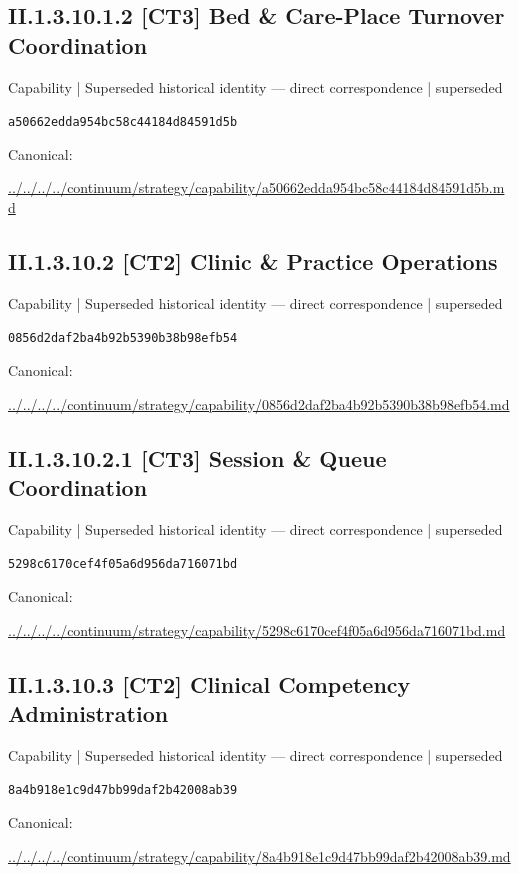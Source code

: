 \documentclass[10pt,a4paper]{article}
\begin{document}
\subsection*{II.1.3.10.1.2 [CT3] Bed \& Care-Place Turnover Coordination}
{\small Capability | Superseded historical identity — direct correspondence | superseded}\par
\texttt{a50662edda954bc58c44184d84591d5b}\par
Canonical: \par
{\footnotesize\url{../../../../continuum/strategy/capability/a50662edda954bc58c44184d84591d5b.md}}\par
\subsection*{II.1.3.10.2 [CT2] Clinic \& Practice Operations}
{\small Capability | Superseded historical identity — direct correspondence | superseded}\par
\texttt{0856d2daf2ba4b92b5390b38b98efb54}\par
Canonical: \par
{\footnotesize\url{../../../../continuum/strategy/capability/0856d2daf2ba4b92b5390b38b98efb54.md}}\par
\subsection*{II.1.3.10.2.1 [CT3] Session \& Queue Coordination}
{\small Capability | Superseded historical identity — direct correspondence | superseded}\par
\texttt{5298c6170cef4f05a6d956da716071bd}\par
Canonical: \par
{\footnotesize\url{../../../../continuum/strategy/capability/5298c6170cef4f05a6d956da716071bd.md}}\par
\subsection*{II.1.3.10.3 [CT2] Clinical Competency Administration}
{\small Capability | Superseded historical identity — direct correspondence | superseded}\par
\texttt{8a4b918e1c9d47bb99daf2b42008ab39}\par
Canonical: \par
{\footnotesize\url{../../../../continuum/strategy/capability/8a4b918e1c9d47bb99daf2b42008ab39.md}}\par
\end{document}
